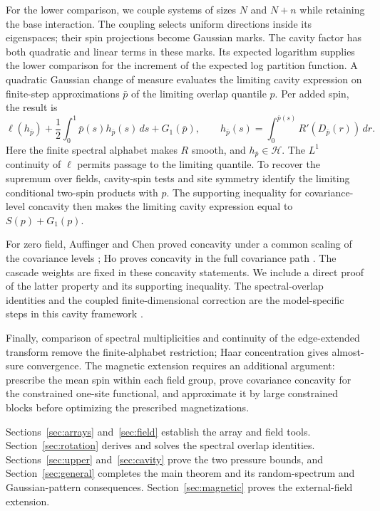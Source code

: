 \documentclass[11pt]{article}
\theoremstyle{definition}
\theoremstyle{remark}
\numberwithin{equation}{section}
\newcommand{\cH}{\mathcal H}
\begin{document}
For the lower comparison, we couple systems of sizes $N$ and $N+n$
while retaining the base interaction. The coupling selects uniform
directions inside its eigenspaces; their spin projections become
Gaussian marks. The cavity factor has both quadratic and linear terms
in these marks. Its expected logarithm supplies the lower comparison
for the increment of the expected log partition function. A quadratic
Gaussian change of measure evaluates the limiting cavity expression
on finite-step approximations $\bar p$ of the limiting overlap quantile
$p$. Per added spin, the result is
\[
 \ell(h_{\bar p})+\frac12\int_0^1\bar p(s)h_{\bar p}(s)\,ds+G_1(\bar p),
 \qquad
 h_{\bar p}(s)=\int_0^{\bar p(s)}R'(D_{\bar p}(r))\,dr.
\]
Here the finite spectral alphabet makes $R$ smooth, and
$h_{\bar p}\in\cH$. The $L^1$ continuity of $\ell$ permits passage to
the limiting quantile. To recover the supremum over fields, cavity-spin
tests and site symmetry identify the limiting conditional two-spin
products with $p$. The supporting inequality for covariance-level
concavity then makes the limiting cavity expression equal to
$S(p)+G_1(p)$.

For zero field, Auffinger and Chen proved concavity under a common scaling
of the covariance levels \cite[Theorem~1]{AuffingerChen2016}; Ho proves
concavity in the full covariance path \cite[Theorem~1.8]{Ho2026}.
The cascade weights are fixed in these concavity statements. We include
a direct proof of the latter property and its supporting inequality.
The spectral-overlap identities and the coupled finite-dimensional
correction are the model-specific steps in this cavity framework
\cite{ASS2003}.

Finally, comparison of spectral multiplicities and continuity of the
edge-extended transform remove the finite-alphabet restriction; Haar
concentration gives almost-sure convergence. The magnetic extension
requires an additional argument: prescribe the mean spin within each
field group, prove covariance concavity for the constrained one-site
functional, and approximate it by large constrained blocks before
optimizing the prescribed magnetizations.

Sections~\ref{sec:arrays} and~\ref{sec:field} establish the array and field
tools. Section~\ref{sec:rotation} derives and solves the spectral overlap
identities. Sections~\ref{sec:upper} and~\ref{sec:cavity} prove the two
pressure bounds, and Section~\ref{sec:general} completes the main theorem
and its random-spectrum and Gaussian-pattern consequences.
Section~\ref{sec:magnetic} proves the external-field extension.









\end{document}
